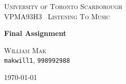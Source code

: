 \begin{titlepage}
    \newcommand{\HRule}{\rule{\linewidth}{0.5mm}}

    \begin{center}
        \textsc{\LARGE University of Toronto Scarborough}\\[0.4cm]
        \textsc{\Large VPMA93H3\ \textendash{} Listening To Music}\\[0.25cm]
        \vspace*{\fill}

        {\huge \bfseries Final Assignment}\\[1cm]

        \begin{minipage}{0.5\textwidth}
            \begin{flushleft}
            \end{flushleft}
        \end{minipage}
        \begin{minipage}{0.4\textwidth}
            \linespread{1.5}
            \textsc{William Mak}\\
            \texttt{makwill1}, \texttt{998992988}\\
        \end{minipage}
        \vfill
        {\large \today}
    \end{center}
\end{titlepage}
